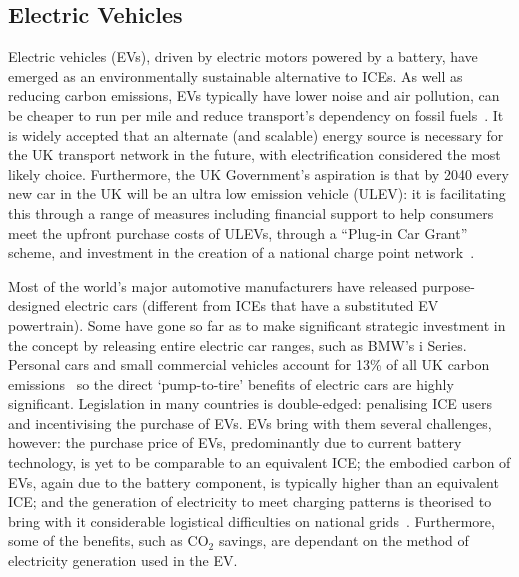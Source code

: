\documentclass[b5paper,10pt]{article}
\begin{document}
\subsection{Electric Vehicles}

Electric vehicles (EVs), driven by electric motors powered by a
battery, have emerged as an environmentally sustainable alternative to
ICEs. As well as reducing carbon emissions, EVs typically have lower
noise and air pollution, can be cheaper to run per mile and reduce
transport's dependency on fossil fuels~\citep{postevs:2010}. It is
widely accepted that an alternate (and scalable) energy source is
necessary for the UK transport network in the future, with
electrification considered the most likely choice. Furthermore, the UK
Government's aspiration is that by 2040 every new car in the UK will
be an ultra low emission vehicle (ULEV): it is facilitating this
through a range of measures including financial support to help
consumers meet the upfront purchase costs of ULEVs, through a
``Plug-in Car Grant'' scheme, and investment in the creation of a
national charge point network~\citep{brook:2015}.

Most of the world's major automotive manufacturers have released
purpose-designed electric cars (different from ICEs that have a
substituted EV powertrain). Some have gone so far as to make
significant strategic investment in the concept by releasing entire
electric car ranges, such as BMW's i Series. Personal cars and small
commercial vehicles account for 13\% of all UK carbon
emissions~\citep{lumsden:2012} so the direct `pump-to-tire' benefits
of electric cars are highly significant. Legislation in many countries
is double-edged: penalising ICE users and incentivising the
purchase of EVs. EVs bring with them several challenges, however: the
purchase price of EVs, predominantly due to current battery
technology, is yet to be comparable to an equivalent ICE; the embodied
carbon of EVs, again due to the battery component, is typically higher
than an equivalent ICE; and the generation of electricity to meet
charging patterns is theorised to bring with it considerable
logistical difficulties on national
grids~\citep{su-et-al:2011,akhavan-rezai-et-al:2015}. Furthermore,
some of the benefits, such as CO$_2$ savings, are dependant on the
method of electricity generation used in the EV.
\end{document}
